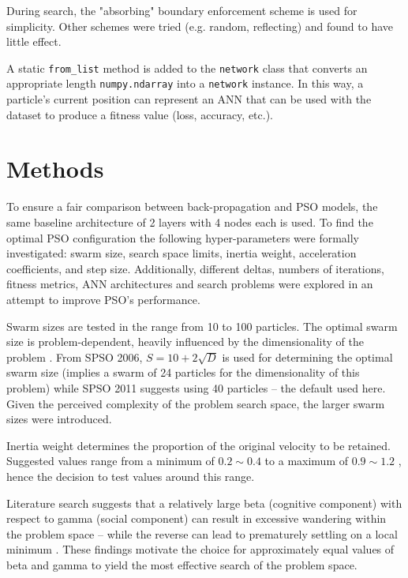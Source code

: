 \documentclass[12pt]{article}
\begin{document}
During search, the "absorbing" \cite{Chu} boundary enforcement scheme is used
for simplicity. Other schemes were tried (e.g. random, reflecting) and
found to have little effect.

A static \texttt{from\_list} method is added to the \texttt{network}
class that converts an appropriate length \texttt{numpy.ndarray}
into a \texttt{network} instance. In this way, a particle's current position
can represent an ANN that can be used with the dataset to produce a
fitness value (loss, accuracy, etc.).


\vspace{-1.5em}
\section{Methods}
\vspace{-1.5em}

To ensure a fair comparison between back-propagation and PSO models, the same baseline architecture of 2 layers with 4 nodes each is used. To find the optimal PSO configuration the following hyper-parameters were formally investigated: swarm size, search space limits, inertia weight, acceleration coefficients, and step size. Additionally, different deltas, numbers of iterations, fitness metrics, ANN architectures and search problems were explored in an attempt to improve PSO's performance.

Swarm sizes are tested in the range from 10 to 100 particles. The optimal swarm size is problem-dependent, heavily influenced by the dimensionality of the problem \cite{Razee}. From SPSO 2006, \(S = 10 + 2\sqrt{D}\) is used for determining the optimal swarm size (implies a swarm of 24 particles for the dimensionality of this problem) while SPSO 2011 suggests using 40 particles \cite{Clerc} -- the default used here. Given the perceived complexity of the problem search space, the larger swarm sizes were introduced.

Inertia weight determines the proportion of the original velocity to be retained. Suggested values range from a minimum of \(0.2\sim0.4\) to a maximum of \(0.9\sim1.2\) \cite{Razee} \cite{Gudise}, hence the decision to test values around this range.

Literature search suggests that a relatively large beta (cognitive component) with respect to gamma (social component) can result in excessive wandering within the problem space -- while the reverse can lead to prematurely settling on a local minimum \cite{Kennedy}. These findings motivate the choice for approximately equal values of beta and gamma to yield the most effective search of the problem space.
\end{document}

